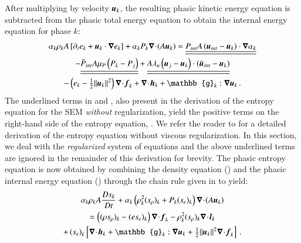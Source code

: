 \documentclass[preprint,10pt]{elsarticle}
\begin{document}
%
After multiplying  by velocity $\boldsymbol u_k$, the resulting phasic kinetic energy equation is subtracted 
from the phasic total energy equation to obtain the internal energy equation for phase $k$:
%
\begin{multline}\label{eq:int-ener-7-eqn-model-sect4}
\alpha_k \rho_k  A \left[ \partial_t  e_k + \mbold u_k \cdot \grad  e_k \right]  
+ \alpha_k P_k \div (A \mbold u_k ) =
  \underline{\underline{P_{int} A \left(\mbold u_{int}-\mbold u_k \right) \cdot \grad \alpha_k}}  \\
- \underline{\underline{\bar{P}_{int} A \mu_P \left(P_k-P_j \right)}} 
+ \underline{\underline{A \lambda_u \left(\mbold u_j-\mbold u_k  \right) \cdot \left(\bar{\mbold u}_{int}- \mbold u_k \right)}}\\
-\left( e_k -  \tfrac{1}{2} \| \mbold u_k \|^2 \right) \div \mbold f_k 
+ \div \mbold h_k + \mathbb{g}_k : \grad \mbold u_k \,.
\end{multline}
%
The underlined terms in  and , also present in the derivation of 
the entropy equation for the SEM \emph{without} regularization, yield the positive terms on the right-hand side of the entropy 
equation, . We refer the reader to  for a detailed derivation of the 
entropy equation  without viscous regularization. In this section, we deal with the \emph{regularized} system of equations and 
the above underlined terms are ignored in the remainder of this derivation for brevity. 
The phasic entropy equation is now obtained by combining the density equation () and the phasic 
internal energy equation () through the chain rule given in  to yield:
%
\begin{multline}\label{eq:ent-res-7-eqn-diss-terms}
\alpha_k \rho_k A \frac{Ds_k}{Dt} 
+ \alpha_k \left(  \rho^2_k  (s_\rho)_k + P_k (s_e)_k  \right) \div (A \mbold u_k )  \\
=  \left( (\rho s_\rho)_k - (e s_e)_k \right) \div \mbold f_k 
- \rho^2_k (s_\rho)_k \div \mbold l_k  \\
+ \left(s_e\right)_k \left[ \div \mbold h_k + \mathbb{g}_k : \grad \mbold u_k +  \tfrac{1}{2} \| \mbold u_k \|^2 \div \mbold f_k \right]
\,.
\end{multline}
\end{document}
